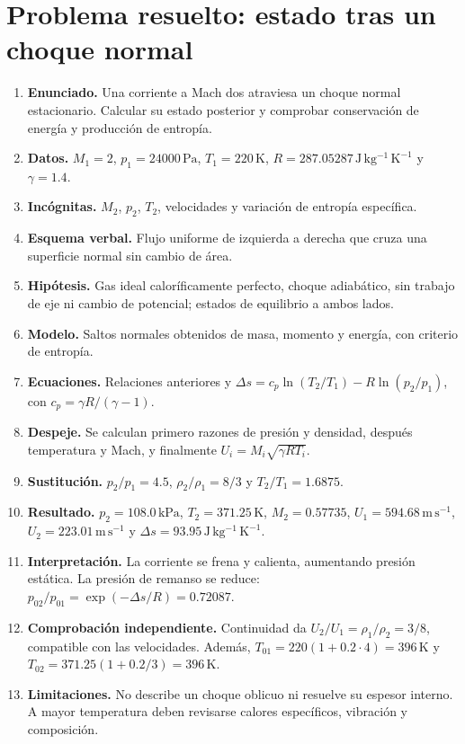 \section{Problema resuelto: estado tras un choque normal}
\begin{enumerate}
\item \textbf{Enunciado.} Una corriente a Mach dos atraviesa un choque normal estacionario. Calcular su estado posterior y comprobar conservación de energía y producción de entropía.
\item \textbf{Datos.} $M_1=2$, $p_1=24000\,\mathrm{Pa}$, $T_1=220\,\mathrm{K}$, $R=287.05287\,\mathrm{J\,kg^{-1}\,K^{-1}}$ y $\gamma=1.4$.
\item \textbf{Incógnitas.} $M_2$, $p_2$, $T_2$, velocidades y variación de entropía específica.
\item \textbf{Esquema verbal.} Flujo uniforme de izquierda a derecha que cruza una superficie normal sin cambio de área.
\item \textbf{Hipótesis.} Gas ideal caloríficamente perfecto, choque adiabático, sin trabajo de eje ni cambio de potencial; estados de equilibrio a ambos lados.
\item \textbf{Modelo.} Saltos normales obtenidos de masa, momento y energía, con criterio de entropía.
\item \textbf{Ecuaciones.} Relaciones anteriores y $\Delta s=c_p\ln(T_2/T_1)-R\ln(p_2/p_1)$, con $c_p=\gamma R/(\gamma-1)$.
\item \textbf{Despeje.} Se calculan primero razones de presión y densidad, después temperatura y Mach, y finalmente $U_i=M_i\sqrt{\gamma RT_i}$.
\item \textbf{Sustitución.} $p_2/p_1=4.5$, $\rho_2/\rho_1=8/3$ y $T_2/T_1=1.6875$.
\item \textbf{Resultado.} $p_2=108.0\,\mathrm{kPa}$, $T_2=371.25\,\mathrm{K}$, $M_2=0.57735$, $U_1=594.68\,\mathrm{m\,s^{-1}}$, $U_2=223.01\,\mathrm{m\,s^{-1}}$ y $\Delta s=93.95\,\mathrm{J\,kg^{-1}\,K^{-1}}$.
\item \textbf{Interpretación.} La corriente se frena y calienta, aumentando presión estática. La presión de remanso se reduce: $p_{02}/p_{01}=\exp(-\Delta s/R)=0.72087$.
\item \textbf{Comprobación independiente.} Continuidad da $U_2/U_1=\rho_1/\rho_2=3/8$, compatible con las velocidades. Además, $T_{01}=220(1+0.2\cdot4)=396\,\mathrm{K}$ y $T_{02}=371.25(1+0.2/3)=396\,\mathrm{K}$.
\item \textbf{Limitaciones.} No describe un choque oblicuo ni resuelve su espesor interno. A mayor temperatura deben revisarse calores específicos, vibración y composición.
\end{enumerate}

